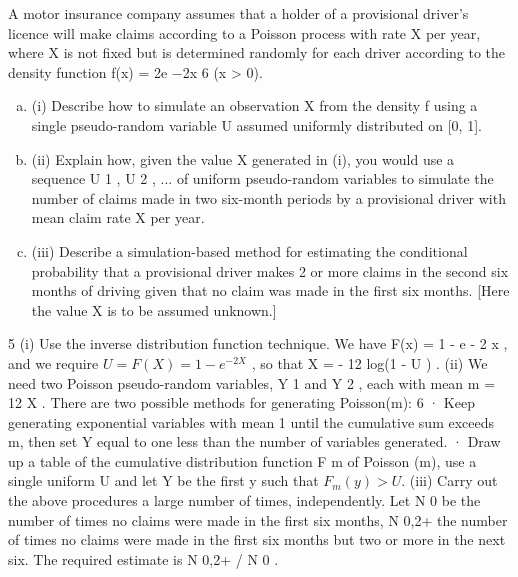 \usepackage{vmargin}
\usepackage{amsmath}
\usepackage{graphics}
\usepackage{epsfig}
\usepackage{enumerate}
\usepackage{multicol}
\usepackage{subfigure}
\usepackage{fancyhdr}
\usepackage{listings}
\usepackage{framed}
\usepackage{graphicx}
\usepackage{amsmath}
\usepackage{chngpage}

\usepackage{vmargin}



\setmargins{2.0cm}{2.5cm}{16 cm}{22cm}{0.5cm}{0cm}{1cm}{1cm}

\renewcommand{\baselinestretch}{1.3}

\setcounter{MaxMatrixCols}{10}



A motor insurance company assumes that a holder of a provisional driver’s
licence will make claims according to a Poisson process with rate X per year,
where X is not fixed but is determined randomly for each driver according to the
density function
f(x) = 2e −2x
6
(x > 0).
\begin{enumerate}[(a)]
\item (i) Describe how to simulate an observation X from the density f using a
single pseudo-random variable U assumed uniformly distributed on [0, 1].
\item 
(ii) Explain how, given the value X generated in (i), you would use a sequence
U 1 , U 2 , ... of uniform pseudo-random variables to simulate the number of
claims made in two six-month periods by a provisional driver with mean
claim rate X per year.
\item 
(iii) Describe a simulation-based method for estimating the conditional
probability that a provisional driver makes 2 or more claims in the second
six months of driving given that no claim was made in the first six
months. [Here the value X is to be assumed unknown.]
\end{enumerate}
\newpage
5
(i)
Use the inverse distribution function technique.
We have F(x) = 1 - e - 2 x , and we require $U = F(X) = 1 - e^{- 2 X}$ , so that
X = - 12 log(1 - U ) .
(ii)
We need two Poisson pseudo-random variables, Y 1 and Y 2 , each with
mean m = 12 X .
There are two possible methods for generating Poisson(m):
6
· Keep generating exponential variables with mean 1 until the
cumulative sum exceeds m, then set Y equal to one less than the
number of variables generated.
· Draw up a table of the cumulative distribution function F m of
Poisson (m), use a single uniform U and let Y be the first y such
that $F_m (y) > U$.
(iii) Carry out the above procedures a large number of times, independently.
Let N 0 be the number of times no claims were made in the first six
months, N 0,2+ the number of times no claims were made in the first six
months but two or more in the next six. The required estimate is
N 0,2+ / N 0 .


